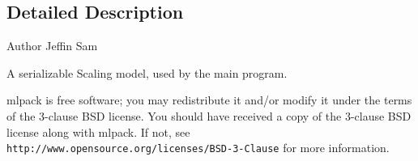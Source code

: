 \subsection{Detailed Description}
\begin{DoxyAuthor}{Author}
Jeffin Sam
\end{DoxyAuthor}
A serializable Scaling model, used by the main program.

mlpack is free software; you may redistribute it and/or modify it under the terms of the 3-\/clause B\+SD license. You should have received a copy of the 3-\/clause B\+SD license along with mlpack. If not, see {\tt http\+://www.\+opensource.\+org/licenses/\+B\+S\+D-\/3-\/\+Clause} for more information. 